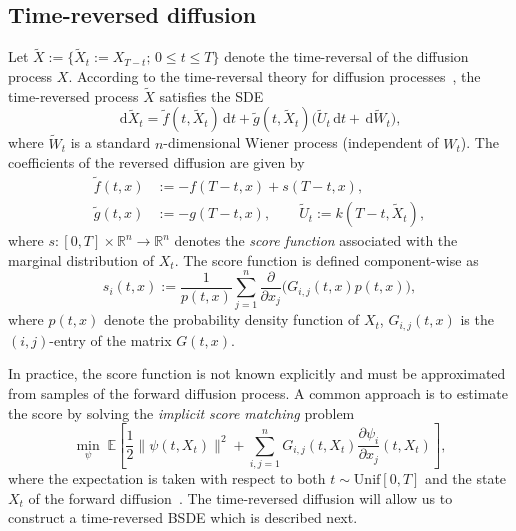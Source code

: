 \documentclass[letterpaper, 10 pt, conference]{ieeeconf}  %
\def\R{\mathbb{R}}
\def\R{\mathbb{R}}
\newcommand{\ud}{\,\mathrm{d}}
\newcommand{\Xr}{\tilde X}
\newcommand{\fr}{\tilde f}
\newcommand{\gr}{\tilde g}
\newcommand{\Ur}{\tilde U}
\newcommand{\Wr}{\tilde W}
\begin{document}
\subsection{Time-reversed diffusion}
Let $\Xr:=\{\Xr_t :=X_{T-t};\,0\leq t\leq T\}$ denote 
the time-reversal of the diffusion process $X$. According to the time-reversal theory for diffusion processes~\cite{haussmann1986time,cattiaux2023time}, the time-reversed process $\Xr$ satisfies the SDE
\begin{equation}\label{eq:tr-fsde}
    \ud \Xr_t = \fr(t, \Xr_t) \ud t  + \gr(t, \Xr_t)\big(\Ur_t \ud t+ \ud \Wr_t\big),
\end{equation}
where $\Wr_t$ is a standard $n$-dimensional Wiener process (independent of $W_t$). The coefficients of the reversed diffusion are given by
\begin{align*}
    \fr(t,x) &:= -f(T-t,x) + s(T-t,x),\\
    \gr(t,x) &:= - g(T-t,x),\qquad
    \Ur_t := k(T-t,\Xr_t),
\end{align*}
where $s: [0,T] \times \R^n \to \R^n$ denotes the {\it score function} associated with the marginal distribution of $X_t$. The score function  is defined component-wise as
\begin{equation}
    s_i(t,x) := \frac{1}{p(t,x)} \sum_{j=1}^n \frac{\partial}{\partial x_j}\big(G_{i,j}(t, x)p(t,x)\big),
\end{equation}
where $p(t,x)$ denote the probability density function of $X_t$, $G_{i,j}(t, x)$ is the $(i,j)$-entry of the matrix $G(t,x)$. 

In practice, the score function is not known explicitly and must be approximated from samples of the forward diffusion process.  
A common approach is to estimate the score by solving the \emph{implicit score matching} problem 
\begin{equation}\label{eq:score-opt}
    \min_\psi\; \mathbb E\left[\frac{1}{2}\|\psi(t,X_t)\|^2 + \sum_{i,j=1}^nG_{i,j}(t,X_t) \frac{\partial \psi_i}{\partial x_j}(t,X_t)\right],
\end{equation}
where the expectation is taken with respect to both $t\sim\mathrm{Unif}[0,T]$ and the state $X_t$ of the forward diffusion~\cite{song2019generative,hyvarinen2005estimation}.
The time-reversed diffusion will allow us to construct a time-reversed BSDE which is described next. 
\end{document}
